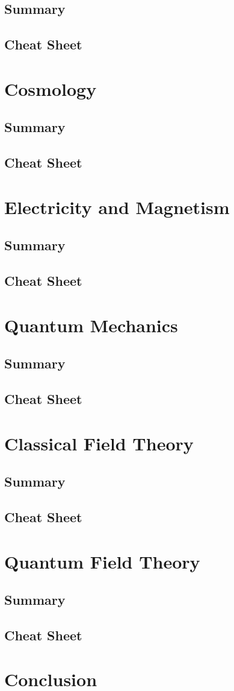 \documentclass[12pt]{book}
\begin{document}
\section{Summary}
\section{Cheat Sheet}

\chapter{Cosmology}
\section{Summary}
\section{Cheat Sheet}

\chapter{Electricity and Magnetism}
\section{Summary}
\section{Cheat Sheet}

\chapter{Quantum Mechanics}
\section{Summary}
\section{Cheat Sheet}

\chapter{Classical Field Theory}
\section{Summary}
\section{Cheat Sheet}

\chapter{Quantum Field Theory}
\section{Summary}
\section{Cheat Sheet}

\chapter{Conclusion}



\end{document}
